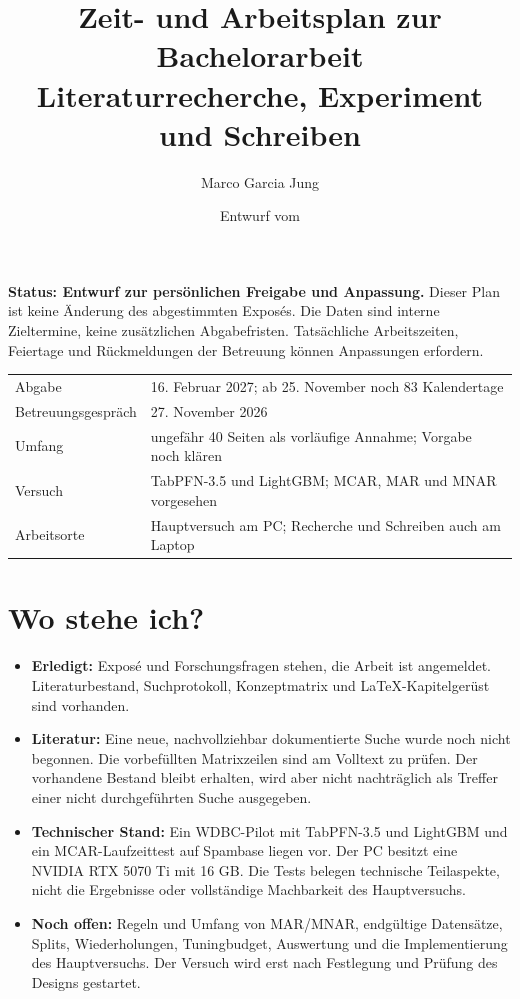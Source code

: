 \documentclass[11pt,a4paper]{article}
\title{Zeit- und Arbeitsplan zur Bachelorarbeit\\
\large Literaturrecherche, Experiment und Schreiben}
\author{Marco Garcia Jung}
\date{Entwurf vom \datenstand}
\newcommand{\abgabe}{16. Februar 2027}
\newcommand{\gespraech}{27. November 2026}
\begin{document}
\maketitle

\textbf{Status: Entwurf zur persönlichen Freigabe und Anpassung.}
Dieser Plan ist keine Änderung des abgestimmten Exposés. Die Daten sind
interne Zieltermine, keine zusätzlichen Abgabefristen. Tatsächliche
Arbeitszeiten, Feiertage und Rückmeldungen der Betreuung können Anpassungen
erfordern.

\begin{tabular}{@{}p{4.0cm}p{11.3cm}@{}}
\toprule
Abgabe & \abgabe{}; ab 25. November noch 83 Kalendertage \\
Betreuungsgespräch & \gespraech{} \\
Umfang & ungefähr 40 Seiten als vorläufige Annahme; Vorgabe noch klären \\
Versuch & TabPFN-3.5 und LightGBM; MCAR, MAR und MNAR vorgesehen \\
Arbeitsorte & Hauptversuch am PC; Recherche und Schreiben auch am Laptop \\
\bottomrule
\end{tabular}

\section{Wo stehe ich?}

\begin{itemize}
  \item \textbf{Erledigt:} Exposé und Forschungsfragen stehen, die Arbeit ist
  angemeldet. Literaturbestand, Suchprotokoll, Konzeptmatrix und
  LaTeX-Kapitelgerüst sind vorhanden.
  \item \textbf{Literatur:} Eine neue, nachvollziehbar dokumentierte Suche
  wurde noch nicht begonnen. Die vorbefüllten Matrixzeilen sind am Volltext
  zu prüfen. Der vorhandene Bestand bleibt erhalten, wird aber nicht
  nachträglich als Treffer einer nicht durchgeführten Suche ausgegeben.
  \item \textbf{Technischer Stand:} Ein WDBC-Pilot mit TabPFN-3.5 und
  LightGBM und ein MCAR-Laufzeittest auf Spambase liegen vor. Der PC besitzt
  eine NVIDIA RTX 5070 Ti mit 16 GB. Die Tests belegen technische Teilaspekte,
  nicht die Ergebnisse oder vollständige Machbarkeit des Hauptversuchs.
  \item \textbf{Noch offen:} Regeln und Umfang von MAR/MNAR, endgültige
  Datensätze, Splits, Wiederholungen, Tuningbudget, Auswertung und die
  Implementierung des Hauptversuchs. Der Versuch wird erst nach Festlegung
  und Prüfung des Designs gestartet.
\end{itemize}
\end{document}
